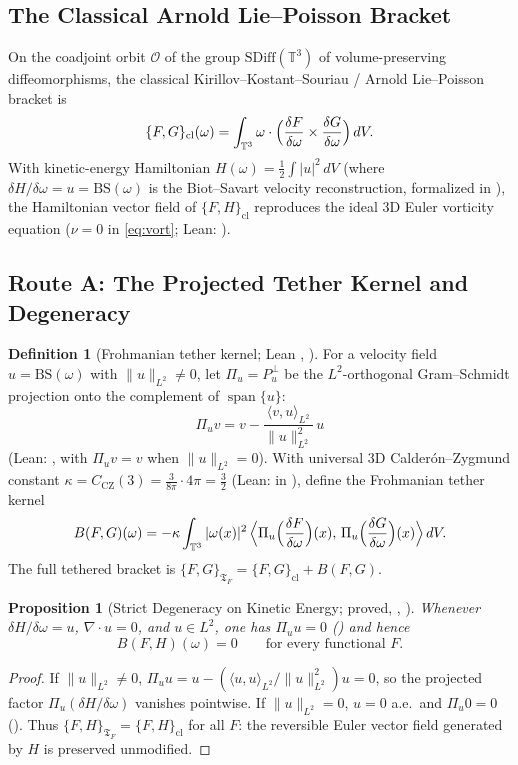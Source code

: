 \documentclass[11pt,a4paper]{article}
\theoremstyle{plain}
\newtheorem{proposition}{Proposition}[section]
\theoremstyle{definition}
\newtheorem{definition}{Definition}[section]
\theoremstyle{remark}
\newcommand{\T}{\mathbb{T}^3}
\newcommand{\Tf}{\mathfrak{T}_F}
\newcommand{\CZ}{C_{\mathrm{CZ}}}
\begin{document}
\subsection{The Classical Arnold Lie--Poisson Bracket}
On the coadjoint orbit $\mathcal O$ of the group $\mathrm{SDiff}(\T)$ of volume-preserving diffeomorphisms, the classical Kirillov--Kostant--Souriau / Arnold Lie--Poisson bracket \cite{Arnold1966,ArnoldKhesin1998} is
\[
\{F,G\}_{\mathrm{cl}}(\omega)=\int_{\T}\omega\cdot\Bigl(\frac{\delta F}{\delta\omega}\times\frac{\delta G}{\delta\omega}\Bigr)\,dV .
\]
With kinetic-energy Hamiltonian $H(\omega)=\tfrac12\int|u|^2\,dV$ (where $\delta H/\delta\omega=u=\mathrm{BS}(\omega)$ is the Biot--Savart velocity reconstruction, formalized in ), the Hamiltonian vector field of $\{F,H\}_{\mathrm{cl}}$ reproduces the ideal 3D Euler vorticity equation ($\nu=0$ in \eqref{eq:vort}; Lean: ).

\subsection{Route A: The Projected Tether Kernel and Degeneracy}
\begin{definition}[Frohmanian tether kernel; Lean , ]\label{def:tether}
For a velocity field $u=\mathrm{BS}(\omega)$ with $\|u\|_{L^2}\neq0$, let $\Pi_u=P^\perp_u$ be the $L^2$-orthogonal Gram--Schmidt projection onto the complement of $\operatorname{span}\{u\}$:
\[
\Pi_u v=v-\frac{\langle v,u\rangle_{L^2}}{\|u\|_{L^2}^2}\,u
\]
(Lean: , with $\Pi_u v=v$ when $\|u\|_{L^2}=0$). With universal 3D Calderón--Zygmund constant $\kappa=\CZ(3)=\frac{3}{8\pi}\cdot 4\pi=\frac{3}{2}$ (Lean:  in ), define the Frohmanian tether kernel
\[
B(F,G)(\omega)=-\kappa\int_{\T}|\omega(x)|^2\,\Bigl\langle \Pi_u\Bigl(\frac{\delta F}{\delta\omega}\Bigr)(x),\,\Pi_u\Bigl(\frac{\delta G}{\delta\omega}\Bigr)(x)\Bigr\rangle\,dV .
\]
The full tethered bracket is $\{F,G\}_{\Tf}=\{F,G\}_{\mathrm{cl}}+B(F,G)$.
\end{definition}

\begin{proposition}[Strict Degeneracy on Kinetic Energy; proved, , ]\label{prop:degen}
Whenever $\delta H/\delta\omega=u$, $\nabla\cdot u=0$, and $u\in L^2$, one has $\Pi_u u=0$ () and hence
\[
B(F,H)(\omega)=0\qquad\text{for every functional }F.
\]
\end{proposition}
\begin{proof}
If $\|u\|_{L^2}\ne0$, $\Pi_u u=u-(\langle u,u\rangle_{L^2}/\|u\|_{L^2}^2)u=0$, so the projected factor $\Pi_u(\delta H/\delta\omega)$ vanishes pointwise. If $\|u\|_{L^2}=0$, $u=0$ a.e.\ and $\Pi_u 0=0$ (). Thus $\{F,H\}_{\Tf}=\{F,H\}_{\mathrm{cl}}$ for all $F$: the reversible Euler vector field generated by $H$ is preserved unmodified.
\end{proof}
\end{document}
